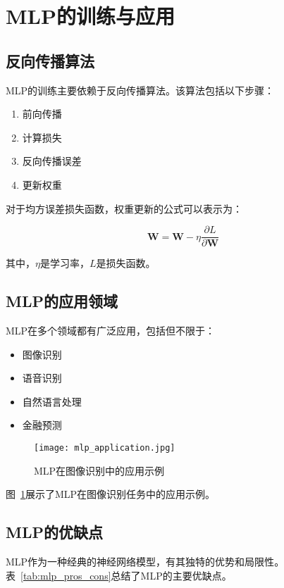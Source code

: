 \section{MLP的训练与应用}

\subsection{反向传播算法}

MLP的训练主要依赖于反向传播算法。该算法包括以下步骤：
\begin{enumerate}
    \item 前向传播
    \item 计算损失
    \item 反向传播误差
    \item 更新权重
\end{enumerate}

对于均方误差损失函数，权重更新的公式可以表示为：

\begin{equation}
    \mathbf{W} = \mathbf{W} - \eta \frac{\partial L}{\partial \mathbf{W}}
\end{equation}

其中，$\eta$是学习率，$L$是损失函数。

\subsection{MLP的应用领域}

MLP在多个领域都有广泛应用，包括但不限于：
\begin{itemize}
    \item 图像识别
    \item 语音识别
    \item 自然语言处理
    \item 金融预测
\end{itemize}

\begin{figure}
    \centering
    \texttt{[image: mlp\_application.jpg]}
    \caption{MLP在图像识别中的应用示例}
    \label{fig:mlp_application}
\end{figure}

图~\ref{fig:mlp_application}展示了MLP在图像识别任务中的应用示例。

\subsection{MLP的优缺点}

MLP作为一种经典的神经网络模型，有其独特的优势和局限性\cite{LeCun2015}。表~\ref{tab:mlp_pros_cons}总结了MLP的主要优缺点。

